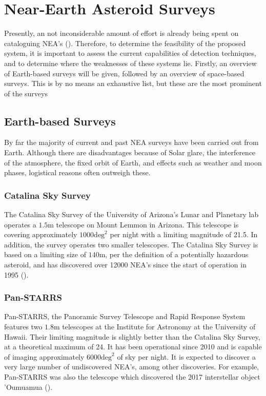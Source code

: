 \chapter{Near-Earth Asteroid Surveys}
\label{ch:surveys}
Presently, an not inconsiderable amount of effort is already being spent on cataloguing NEA's (\cite{NEAsurveys}). Therefore, to determine the feasibility of the proposed system, it is important to assess the current capabilities of detection techniques, and to determine where the weaknesses of these systems lie. Firstly, an overview of Earth-based surveys will be given, followed by an overview of space-based surveys. This is by no means an exhaustive list, but these are the most prominent of the surveys

\section{Earth-based Surveys}

By far the majority of current and past NEA surveys have been carried out from Earth. Although there are disadvantages because of Solar glare, the interference of the atmosphere, the fixed orbit of Earth, and effects such as weather and moon phases, logistical reasons often outweigh these.

\subsection{Catalina Sky Survey}
The Catalina Sky Survey of the University of Arizona's Lunar and Planetary lab operates a $1.5$m telescope on Mount Lemmon in Arizona. This telescope is covering approximately $1000 \mathrm{deg}^2$ per night with a limiting magnitude of 21.5. In addition, the survey operates two smaller telescopes. The Catalina Sky Survey is based on a limiting size of $140$m, per the definition of a potentially hazardous asteroid, and has discovered over 12000 NEA's since the start of operation in 1995 (\cite{catalinaskysurvey}).

\subsection{Pan-STARRS}
Pan-STARRS, the Panoramic Survey Telescope and Rapid Response System features two $1.8$m telescopes at the Institute for Astronomy at the University of Hawaii. Their limiting magnitude is slightly better than the Catalina Sky Survey, at a theoretical maximum of 24. It has been operational since 2010 and is capable of imaging approximately $6000 \mathrm{deg}^2$ of sky per night. It is expected to discover a very large number of undiscovered NEA's, among other discoveries. For example, Pan-STARRS was also the telescope which discovered the 2017 interstellar object 'Oumuamua (\cite{Panstarrs}).

